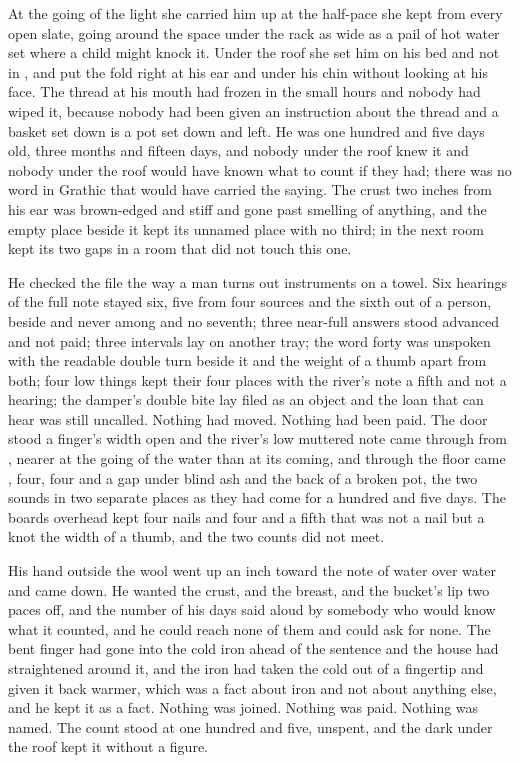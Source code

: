 At the going of the light she carried him up  at the half-pace she kept from every open slate, going around the space under the rack as wide as a pail of hot water set where a child might knock it. Under the  roof she set him on his bed and not in , and put the fold right at his ear and under his chin without looking at his face. The thread at his mouth had frozen in the small hours and nobody had wiped it, because nobody had been given an instruction about the thread and a basket set down is a pot set down and left. He was one hundred and five days old, three months and fifteen days, and nobody under the roof knew it and nobody under the roof would have known what to count if they had; there was no word in Grathic that would have carried the saying. The crust two inches from his ear was brown-edged and stiff and gone past smelling of anything, and the empty place beside it kept its unnamed place with no third; in the next room  kept its two gaps in a room that did not touch this one.

He checked the file the way a man turns out instruments on a towel. Six hearings of the full note stayed six, five from four sources and the sixth out of a person, beside and never among and no seventh; three near-full answers stood advanced and not paid; three intervals lay on another tray; the word forty was unspoken with the readable double turn beside it and the weight of a thumb apart from both; four low things kept their four places with the river's note a fifth and not a hearing; the damper's double bite lay filed as an object and the loan that can hear was still uncalled. Nothing had moved. Nothing had been paid. The door stood a finger's width open and the river's low muttered note came through from , nearer at the going of the water than at its coming, and through the floor came , four, four and a gap under blind ash and the back of a broken pot, the two sounds in two separate places as they had come for a hundred and five days. The boards overhead kept four nails and four and a fifth that was not a nail but a knot the width of a thumb, and the two counts did not meet.

His hand outside the wool went up an inch toward the note of water over water and came down. He wanted the crust, and the breast, and the bucket's lip two paces off, and the number of his days said aloud by somebody who would know what it counted, and he could reach none of them and could ask for none. The bent finger had gone into the cold iron ahead of the sentence and the house had straightened around it, and the iron had taken the cold out of a fingertip and given it back warmer, which was a fact about iron and not about anything else, and he kept it as a fact. Nothing was joined. Nothing was paid. Nothing was named. The count stood at one hundred and five, unspent, and the dark under the roof kept it without a figure.
